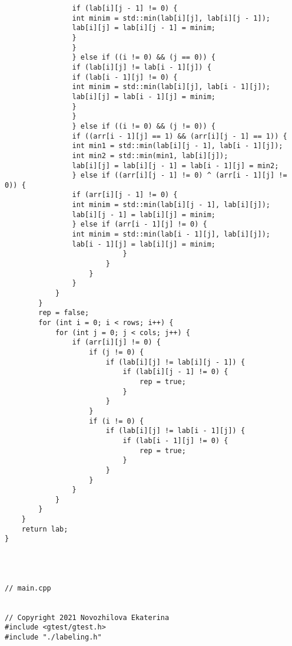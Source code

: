 \documentclass{report}
\begin{document}
\begin{lstlisting}
                if (lab[i][j - 1] != 0) {
                int minim = std::min(lab[i][j], lab[i][j - 1]);
                lab[i][j] = lab[i][j - 1] = minim;
                }
                }
                } else if ((i != 0) && (j == 0)) {
                if (lab[i][j] != lab[i - 1][j]) {
                if (lab[i - 1][j] != 0) {
                int minim = std::min(lab[i][j], lab[i - 1][j]);
                lab[i][j] = lab[i - 1][j] = minim;
                }
                }
                } else if ((i != 0) && (j != 0)) {
                if ((arr[i - 1][j] == 1) && (arr[i][j - 1] == 1)) {
                int min1 = std::min(lab[i][j - 1], lab[i - 1][j]);
                int min2 = std::min(min1, lab[i][j]);
                lab[i][j] = lab[i][j - 1] = lab[i - 1][j] = min2;
                } else if ((arr[i][j - 1] != 0) ^ (arr[i - 1][j] != 0)) {
                if (arr[i][j - 1] != 0) {
                int minim = std::min(lab[i][j - 1], lab[i][j]);
                lab[i][j - 1] = lab[i][j] = minim;
                } else if (arr[i - 1][j] != 0) {
                int minim = std::min(lab[i - 1][j], lab[i][j]);
                lab[i - 1][j] = lab[i][j] = minim;
                            }
                        }
                    }
                }
            }
        }
        rep = false;
        for (int i = 0; i < rows; i++) {
            for (int j = 0; j < cols; j++) {
                if (arr[i][j] != 0) {
                    if (j != 0) {
                        if (lab[i][j] != lab[i][j - 1]) {
                            if (lab[i][j - 1] != 0) {
                                rep = true;
                            }
                        }
                    }
                    if (i != 0) {
                        if (lab[i][j] != lab[i - 1][j]) {
                            if (lab[i - 1][j] != 0) {
                                rep = true;
                            }
                        }
                    }
                }
            }
        }
    }
    return lab;
}




// main.cpp


// Copyright 2021 Novozhilova Ekaterina
#include <gtest/gtest.h>
#include "./labeling.h"


\end{lstlisting}
\end{document}
